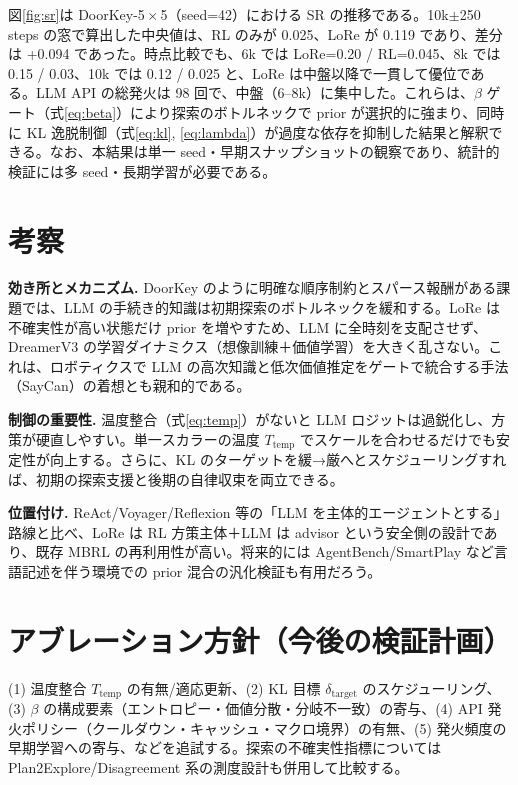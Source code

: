 \documentclass[a4paper,12pt]{article}
\begin{document}
図\ref{fig:sr}は DoorKey-5\,$\times$\,5（seed=42）における SR の推移である。10k$\pm$250 steps の窓で算出した中央値は、RL のみが 0.025、LoRe が 0.119 であり、差分は +0.094 であった。時点比較でも、6k では LoRe=0.20 / RL=0.045、8k では 0.15 / 0.03、10k では 0.12 / 0.025 と、LoRe は中盤以降で一貫して優位である。LLM API の総発火は 98 回で、中盤（6--8k）に集中した。これらは、$\beta$ ゲート（式\eqref{eq:beta}）により探索のボトルネックで prior が選択的に強まり、同時に KL 逸脱制御（式\eqref{eq:kl}, \eqref{eq:lambda}）が過度な依存を抑制した結果と解釈できる。なお、本結果は単一 seed・早期スナップショットの観察であり、統計的検証には多 seed・長期学習が必要である。

\section{考察}
\textbf{効き所とメカニズム.} DoorKey のように明確な順序制約とスパース報酬がある課題では、LLM の手続き的知識は初期探索のボトルネックを緩和する。LoRe は不確実性が高い状態だけ prior を増やすため、LLM に全時刻を支配させず、DreamerV3 の学習ダイナミクス（想像訓練＋価値学習）を大きく乱さない。これは、ロボティクスで LLM の高次知識と低次価値推定をゲートで統合する手法（SayCan）の着想とも親和的である\citep{ahn2022saycan}。

\textbf{制御の重要性.} 温度整合（式\eqref{eq:temp}）がないと LLM ロジットは過鋭化し、方策が硬直しやすい。単一スカラーの温度 $T_{\mathrm{temp}}$ でスケールを合わせるだけでも安定性が向上する。さらに、KL のターゲットを緩→厳へとスケジューリングすれば、初期の探索支援と後期の自律収束を両立できる\citep{hinton2015distill,guo2017calibration}。

\textbf{位置付け.} ReAct/Voyager/Reflexion 等の「LLM を主体的エージェントとする」路線と比べ、LoRe は RL 方策主体＋LLM は advisor という安全側の設計であり、既存 MBRL の再利用性が高い。将来的には AgentBench/SmartPlay など言語記述を伴う環境での prior 混合の汎化検証も有用だろう\citep{liu2023agentbench,wu2023smartplay}。

\section{アブレーション方針（今後の検証計画）}
(1) 温度整合 $T_{\mathrm{temp}}$ の有無/適応更新、(2) KL 目標 $\delta_{\mathrm{target}}$ のスケジューリング、(3) $\beta$ の構成要素（エントロピー・価値分散・分岐不一致）の寄与、(4) API 発火ポリシー（クールダウン・キャッシュ・マクロ境界）の有無、(5) 発火頻度の早期学習への寄与、などを追試する。探索の不確実性指標については Plan2Explore/Disagreement 系の測度設計も併用して比較する\citep{sekar2020plan2explore,pathak2019disagreement}。
\end{document}

